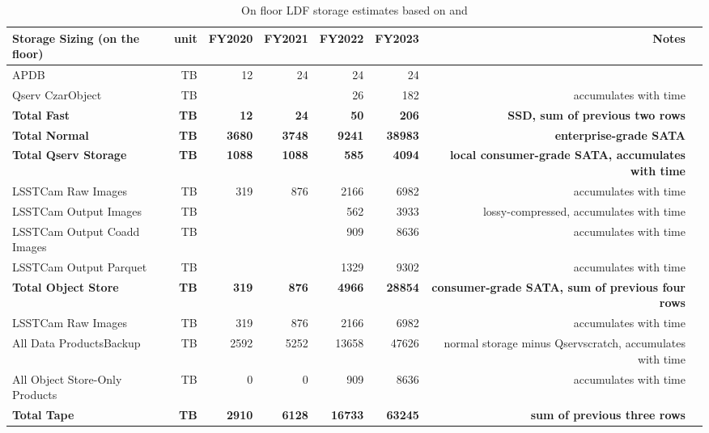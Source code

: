\tiny \begin{longtable} { |p{}  |r  |r  |r  |r  |r  |r  |r |} 
\caption{On floor LDF storage estimates based on  and 
 \label{tab:storageFloor}}\\ 
\hline 
\textbf{Storage Sizing (on the floor)}&\textbf{unit}&\textbf{FY2020}&\textbf{FY2021}&\textbf{FY2022}&\textbf{FY2023}&\textbf{Notes} \\ \hline
{APDB}&{TB}&{12}&{24}&{24}&{24}& \\ \hline
{Qserv Czar\/Object}&{TB}&{}&{}&{26}&{182}&{accumulates with time} \\ \hline
\textbf{Total Fast}&\textbf{TB}&\textbf{12}&\textbf{24}&\textbf{50}&\textbf{206}&\textbf{SSD, sum of previous two rows} \\ \hline
\textbf{Total Normal}&\textbf{TB}&\textbf{3680}&\textbf{3748}&\textbf{9241}&\textbf{38983}&\textbf{enterprise-grade SATA} \\ \hline
\textbf{Total Qserv Storage}&\textbf{TB}&\textbf{1088}&\textbf{1088}&\textbf{585}&\textbf{4094}&\textbf{local consumer-grade SATA, accumulates with time} \\ \hline
{LSSTCam Raw Images}&{TB}&{319}&{876}&{2166}&{6982}&{accumulates with time} \\ \hline
{LSSTCam Output Images}&{TB}&{}&{}&{562}&{3933}&{lossy-compressed, accumulates with time} \\ \hline
{LSSTCam Output Coadd Images}&{TB}&{}&{}&{909}&{8636}&{accumulates with time} \\ \hline
{LSSTCam Output Parquet}&{TB}&{}&{}&{1329}&{9302}&{accumulates with time} \\ \hline
\textbf{Total Object Store}&\textbf{TB}&\textbf{319}&\textbf{876}&\textbf{4966}&\textbf{28854}&\textbf{consumer-grade SATA, sum of previous four rows} \\ \hline
{LSSTCam Raw Images}&{TB}&{319}&{876}&{2166}&{6982}&{accumulates with time} \\ \hline
{All Data Products\/Backup}&{TB}&{2592}&{5252}&{13658}&{47626}&{normal storage minus Qserv\/scratch, accumulates with time} \\ \hline
{All Object Store-Only Products}&{TB}&{0}&{0}&{909}&{8636}&{accumulates with time} \\ \hline
\textbf{Total Tape}&\textbf{TB}&\textbf{2910}&\textbf{6128}&\textbf{16733}&\textbf{63245}&\textbf{sum of previous three rows} \\ \hline
\end{longtable} \normalsize
